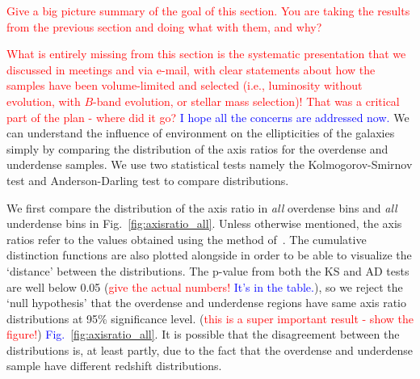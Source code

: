 \documentclass[twocolumn,useAMS,usenatbib]{mn2e}
\newcommand{\rachel}[1]{{\textcolor{red}{#1}}}
\newcommand{\arun}[1]{{\textcolor{blue}{#1}}}
\begin{document}
\rachel{Give a big picture summary of the goal of this section.  You
  are taking the results from the previous section and doing what with
  them, and why?}

\rachel{What is entirely missing from this section is the systematic presentation that we discussed in meetings and via e-mail, with clear statements about how the samples have been volume-limited and selected (i.e., luminosity without evolution, with $B$-band evolution, or stellar mass selection)!  That was a critical part of the plan - where did it go?}
\arun{I hope all the concerns are addressed now.}
We can understand the influence of environment on the ellipticities of the galaxies simply by comparing the distribution of the axis ratios for the overdense and underdense samples. 
We use two statistical tests namely the Kolmogorov-Smirnov test and Anderson-Darling test to compare distributions.

We first compare the distribution of the axis ratio in \emph{all}
overdense bins and \emph{all} underdense bins in Fig.~\ref{fig:axisratio_all}. Unless otherwise mentioned, the axis ratios refer to the values obtained using the method of~\cite{Claire_Fits}.
The cumulative distinction functions are also plotted alongside in order to be able to visualize the `distance' between the distributions.
The p-value from both the KS and AD tests are well below 0.05 (\rachel{give the actual numbers!} \arun{It's in the table.}), 
so we reject the `null hypothesis' that the overdense and underdense regions have same axis ratio distributions at 95\% significance level.
(\rachel{this is a super important result - show the figure!}) \arun{Fig.~\ref{fig:axisratio_all}}.
It is possible that the disagreement between the distributions is, at least partly, due to the fact that the overdense and underdense sample have different redshift distributions.
\end{document}
